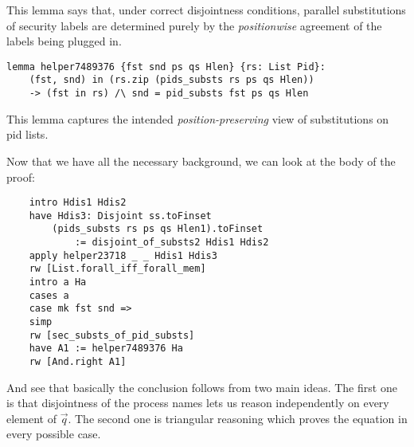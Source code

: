 \documentclass[12pt,a4paper,twoside]{book}
\begin{document}
This lemma says that, under correct disjointness conditions, parallel substitutions of security labels are determined purely by the \emph{positionwise} agreement of the labels being plugged in.
\begin{samepage}
\begin{verbatim}
lemma helper7489376 {fst snd ps qs Hlen} {rs: List Pid}:
    (fst, snd) in (rs.zip (pids_substs rs ps qs Hlen))
    -> (fst in rs) /\ snd = pid_substs fst ps qs Hlen
\end{verbatim}
\end{samepage}
This lemma captures the intended \emph{position-preserving} view of substitutions on pid lists.

Now that we have all the necessary background, we can look at the body of the proof:
\begin{samepage}
\begin{verbatim}
    intro Hdis1 Hdis2
    have Hdis3: Disjoint ss.toFinset
        (pids_substs rs ps qs Hlen1).toFinset
            := disjoint_of_substs2 Hdis1 Hdis2
    apply helper23718 _ _ Hdis1 Hdis3
    rw [List.forall_iff_forall_mem]
    intro a Ha
    cases a
    case mk fst snd =>
    simp
    rw [sec_substs_of_pid_substs]
    have A1 := helper7489376 Ha
    rw [And.right A1]
\end{verbatim}
\end{samepage}
And see that basically the conclusion follows from two main ideas. The first one is that disjointness of the process names lets us reason independently on every element of $\vec{q}$. The second one is triangular reasoning which proves the equation in every possible case. 
\end{document}
